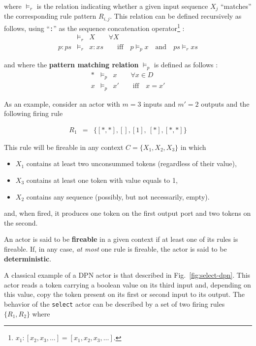 where $\models_r$ is the relation indicating whether a given input
sequence $X_j$ ``matches'' the corresponding rule pattern $R_{i,j}$. This relation can be defined
recursively as follows, using ``\verb|:|'' as the sequence concatenation
operator\footnote{$x_1 : [x_2,x_3,\ldots] = [x_1,x_2,x_3,\ldots]$.} : 
\begin{eqnarray*}
    []  & \models_r & X  \qquad \forall X \\
    p:ps & \models_r & x:xs \qquad \text{iff}\quad p \models_p x \quad \text{and}\quad ps \models_r xs
\end{eqnarray*}

and where the \textbf{pattern matching relation} $\models_p$ is defined as follows :
\begin{eqnarray*}
* & \models_p & x \qquad \forall x \in D \\
x & \models_p & x' \qquad \text{iff}\quad x=x'
\end{eqnarray*}

\medskip
\noindent
As an example, consider an actor with $m=3$ inputs and $m'=2$ outputs and the following firing rule

\begin{eqnarray*}
    R_1 & = & \{ [*,*], [], [1],\ [*], [*,*] \}
\end{eqnarray*}

\noindent
This rule will be fireable in any context $C=\{X_1,X_2,X_3\}$ in which
\begin{itemize}
\item $X_1$ contains at least two unconsummed tokens (regardless of their value),
\item $X_3$ contains at least one token with value equals to 1,
\item $X_2$ contains any sequence (possibly, but not necessarily, empty).
\end{itemize}
\noindent
and, when fired, it produces one token on the first output port and two tokens on the second.

\medskip
\noindent
An actor is said to be \textbf{fireable} in a given context if at least one of its rules is
fireable. If, in any case, \emph{at most} one rule is fireable, the actor is said to be
\textbf{deterministic}.

\medskip
\noindent
A classical example of a DPN actor is that described in Fig.~\ref{fig:select-dpn}. This actor reads
a token carrying a boolean value on its third input and, depending on this value, copy the token
present on its first or second input to its output. The behavior of the \texttt{select} actor can be
described by a set of two firing rules $\{R_1, R_2\}$ where

